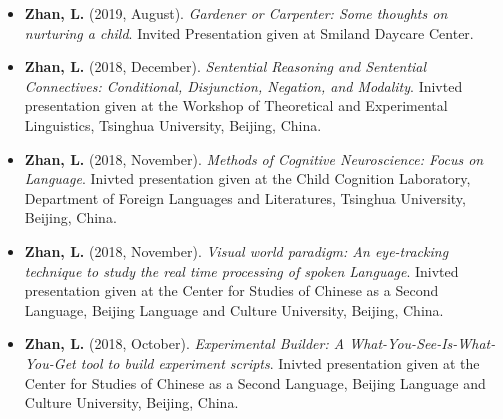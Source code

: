 \documentclass[12pt,]{article}
\begin{document}
\begin{itemize}
\item
  \textbf{Zhan, L.} (2019, August). \emph{Gardener or Carpenter: Some
  thoughts on nurturing a child}. Invited Presentation given at Smiland
  Daycare Center. \href{https://publications.likan.info/talks/parent/}{
  \footnotesize \faExternalLink* }
\item
  \textbf{Zhan, L.} (2018, December). \emph{Sentential Reasoning and
  Sentential Connectives: Conditional, Disjunction, Negation, and
  Modality}. Inivted presentation given at the Workshop of Theoretical
  and Experimental Linguistics, Tsinghua University, Beijing, China.
  \href{https://publications.likan.info/Talks/Sentential_Reasoning_Sentential_Connectives.pdf}{
  \faFilePdf[regular] }
\item
  \textbf{Zhan, L.} (2018, November). \emph{Methods of Cognitive
  Neuroscience: Focus on Language}. Inivted presentation given at the
  Child Cognition Laboratory, Department of Foreign Languages and
  Literatures, Tsinghua University, Beijing, China.
  \href{https://publications.likan.info/Talks/MethodsCognNeurosciLang2018NOV.pdf}{
  \faFilePdf[regular] }
\item
  \textbf{Zhan, L.} (2018, November). \emph{Visual world paradigm: An
  eye-tracking technique to study the real time processing of spoken
  Language}. Inivted presentation given at the Center for Studies of
  Chinese as a Second Language, Beijing Language and Culture University,
  Beijing, China.
  \href{https://publications.likan.info/Talks/Visual_World_Paradigm.pdf}{
  \faFilePdf[regular] }
\item
  \textbf{Zhan, L.} (2018, October). \emph{Experimental Builder: A
  What-You-See-Is-What-You-Get tool to build experiment scripts}.
  Inivted presentation given at the Center for Studies of Chinese as a
  Second Language, Beijing Language and Culture University, Beijing,
  China.
  \href{https://publications.likan.info/Eyelink_Experiment_Builder_Training_Materials/}{
  \faFilePdf[regular] }
\end{itemize}
\end{document}
